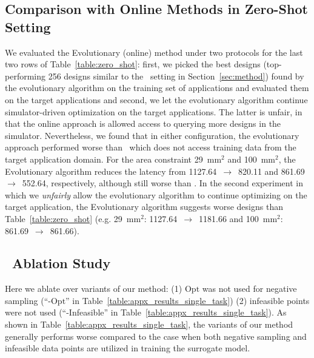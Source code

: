 \subsection{Comparison with Online Methods in Zero-Shot Setting}
\label{sec:app_zero_shot}
%
We evaluated the Evolutionary (online) method under two protocols for the last two rows of Table~\ref{table:zero_shot}: first, we picked the best designs (top-performing 256 designs similar to the \primemethodname\ setting in Section~\ref{sec:method}) found by the evolutionary algorithm on the training set of applications and evaluated them on the target applications and second, we let the evolutionary algorithm continue simulator-driven optimization on the target applications.
%
The latter is unfair, in that the online approach is allowed access to querying more designs in the simulator. Nevertheless, we found that in either configuration, the evolutionary approach performed worse than \primemethodname\, which does not access training data from the target application domain.
%
For the area constraint 29~mm$^2$ and 100~mm$^2$, the Evolutionary algorithm reduces the latency from 1127.64~$\rightarrow$~820.11 and 861.69~$\rightarrow$~552.64, respectively, although still worse than \primemethodname.
%
In the second experiment in which we \emph{unfairly} allow the evolutionary algorithm to continue optimizing on the target application, the Evolutionary algorithm suggests worse designs than Table~\ref{table:zero_shot} (e.g. 29~mm$^2$: 1127.64~$\rightarrow$~1181.66 and 100~mm$^2$: 861.69~$\rightarrow$~861.66).
%


\subsection{\primemethodname\ Ablation Study}
\label{sec:appx_ablation}



Here we ablate over variants of our method: (1) $\mathrm{Opt}$ was not used for negative sampling (``\primemethodname-$\mathrm{Opt}$'' in Table~\ref{table:appx_results_single_task}) (2)  infeasible points were not used (``\primemethodname-Infeasible'' in Table~\ref{table:appx_results_single_task}).
%
As shown in Table~\ref{table:appx_results_single_task}, the variants of our method generally performs worse compared to the case when both negative sampling and infeasible data points are utilized in training the surrogate model.

